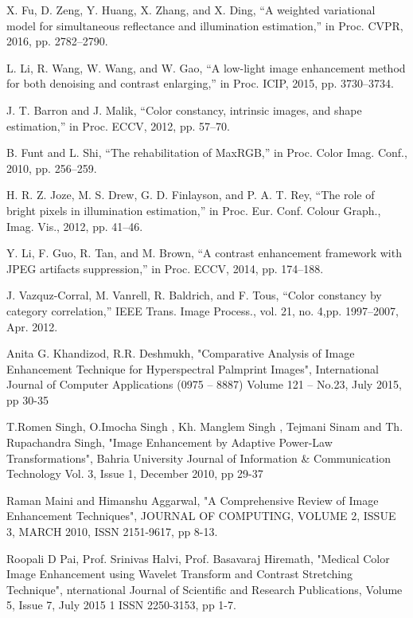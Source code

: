 \begin{thebibliography}{111}
	 X. Fu, D. Zeng, Y. Huang, X. Zhang, and X. Ding, “A weighted variational model for 
	simultaneous reflectance and illumination estimation,” in Proc. CVPR, 2016, pp. 2782–2790.

	 L. Li, R. Wang, W. Wang, and W. Gao, “A low-light image enhancement method for both 
	denoising and contrast enlarging,” in Proc. ICIP, 2015, pp. 3730–3734.

	 J. T. Barron and J. Malik, “Color constancy, intrinsic images, and shape 
	estimation,” in Proc. ECCV, 2012, pp. 57–70.	

	 B. Funt and L. Shi, “The rehabilitation of MaxRGB,” in Proc. Color Imag. 
	Conf., 2010, pp. 256–259.

	 H. R. Z. Joze, M. S. Drew, G. D. Finlayson, and P. A. T. Rey, “The role of bright 
	pixels in illumination estimation,” in Proc. Eur. Conf. Colour Graph., Imag. Vis., 2012, pp. 41–46.

	 Y. Li, F. Guo, R. Tan, and M. Brown, “A contrast enhancement framework with JPEG 
	artifacts suppression,” in Proc. ECCV, 2014, pp. 174–188.

	 J. Vazquz-Corral, M. Vanrell, R. Baldrich, and F. Tous, “Color constancy by 
	category correlation,” IEEE Trans. Image Process., vol. 21, no. 4,pp. 1997–2007, Apr. 2012.

	 Anita G. Khandizod, R.R. Deshmukh, "Comparative Analysis of Image Enhancement 
	Technique for Hyperspectral Palmprint Images", International Journal of Computer Applications (0975 
	– 8887) Volume 121 – No.23, July 2015, pp 30-35

	T.Romen Singh, O.Imocha Singh , Kh. Manglem Singh , Tejmani Sinam and Th. Rupachandra 
	Singh, "Image Enhancement by Adaptive Power-Law Transformations", Bahria University Journal of 
	Information & Communication Technology Vol. 3, Issue 1, December 2010, pp 29-37

	 Raman Maini and Himanshu Aggarwal, "A Comprehensive Review of Image Enhancement 
	Techniques", JOURNAL OF COMPUTING, VOLUME 2, ISSUE 3, MARCH 2010, ISSN 2151-9617, pp 8-13.

	 Roopali D Pai, Prof. Srinivas Halvi, Prof. Basavaraj Hiremath, "Medical Color Image 
	Enhancement using Wavelet Transform and Contrast Stretching Technique", nternational Journal of 
	Scientific and Research Publications, Volume 5, Issue 7, July 2015 1 ISSN 2250-3153, pp 1-7.


\end{thebibliography}
